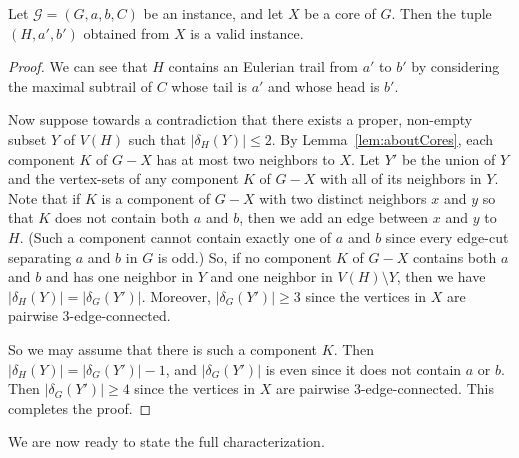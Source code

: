 \documentclass[a4paper, 12pt]{article}
\let\leq\leqslant
\let\geq\geqslant
\newcommand{\RMM}[1]{\textcolor{orange}{RM: #1}}
\begin{document}
\begin{lemma}
\label{lem:isValid}
Let $\mathcal{G}=(G, a, b, C)$ be an instance, and let $X$ be a core of $G$. Then the tuple $(H, a', b')$ obtained from $X$ is a valid instance.
\end{lemma}
\begin{proof}
	We can see that $H$ contains an Eulerian trail from $a'$ to $b'$ by considering the maximal subtrail of $C$ whose tail is $a'$ and whose head is $b'$. 
    
    Now suppose towards a contradiction that there exists a proper, non-empty subset $Y$ of $V(H)$ such that $|\delta_H(Y)|\leq 2$. By Lemma~\ref{lem:aboutCores}, each component $K$ of $G-X$ has at most two neighbors to $X$. Let $Y'$ be the union of $Y$ and the vertex-sets of any component $K$ of $G-X$ with all of its neighbors in $Y$. Note that if $K$ is a component of $G-X$ with two distinct neighbors $x$ and $y$ so that $K$ does not contain both $a$ and $b$, then we add an edge between $x$ and $y$ to $H$. (Such a component cannot contain exactly one of $a$ and $b$ since every edge-cut separating $a$ and $b$ in $G$ is odd.) So, if no component $K$ of $G-X$ contains both $a$ and $b$ and has one neighbor in $Y$ and one neighbor in $V(H)\setminus Y$, then we have $|\delta_H(Y)|=|\delta_G(Y')|$. Moreover, $|\delta_G(Y')| \geq 3$ since the vertices in $X$ are pairwise $3$-edge-connected.

    So we may assume that there is such a component $K$. Then $|\delta_H(Y)|=|\delta_G(Y')|-1$, and $|\delta_G(Y')|$ is even since it does not contain $a$ or $b$. Then $|\delta_G(Y')| \geq 4$ since the vertices in $X$ are pairwise $3$-edge-connected. This completes the proof.
\end{proof}

We are now ready to state the full characterization. %
\end{document}
